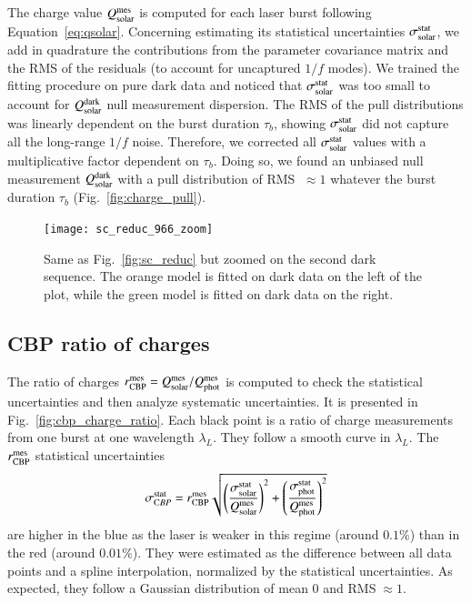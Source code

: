 The charge value $Q_{\mathrm{solar}}^{\mathrm{mes}}$ is computed for each laser burst following Equation~\ref{eq:qsolar}. Concerning estimating its statistical uncertainties $\sigma_{\mathrm{solar}}^{\mathrm{stat}}$, we add in quadrature the contributions from the parameter covariance matrix and the RMS of the residuals (to account for uncaptured $1/f$ modes). We trained the fitting procedure on pure dark data and noticed that $\sigma_{\mathrm{solar}}^{\mathrm{stat}}$ was too small to account for $Q_{\mathrm{solar}}^{\rm dark}$ null measurement dispersion. The RMS of the pull distributions was linearly dependent on the burst duration $\tau_b$, showing $\sigma_{\mathrm{solar}}^{\mathrm{stat}}$ did not capture all the long-range $1/f$ noise. Therefore, we corrected all $\sigma_{\mathrm{solar}}^{\mathrm{stat}}$ values with a multiplicative factor dependent on $\tau_b$. Doing so, we found an unbiased null measurement $Q_{\mathrm{solar}}^{\rm dark}$ with a pull distribution of RMS $\;\approx 1$ whatever the burst duration $\tau_b$ (Fig.~\ref{fig:charge_pull}). 

\begin{figure}%
\centering
\texttt{[image: sc\_reduc\_966\_zoom]}
\caption{Same as Fig.~\ref{fig:sc_reduc} but zoomed on the second dark sequence. The orange model is fitted on dark data on the left of the plot, while the green model is fitted on dark data on the right.}\label{fig:sc_reduc_zoom}
\end{figure}


\subsection{CBP ratio of charges}

The ratio of charges $r_{\rm CBP}^{\rm mes} = Q_{\mathrm{solar}}^{\mathrm{mes}}/Q_{\mathrm{phot}}^{\mathrm{mes}}$ is computed to check the statistical uncertainties and then analyze systematic uncertainties. It is presented in Fig.~\ref{fig:cbp_charge_ratio}. Each black point is a ratio of charge measurements from one burst at one wavelength $\lambda_L$. They follow a smooth curve in $\lambda_L$. The $r_{\rm CBP}^{\rm mes}$ statistical uncertainties 
\begin{equation}
    \sigma_{\mathrm CBP}^{\rm stat} = r_{\rm CBP}^{\rm mes} \sqrt{\left(\frac{\sigma_{\mathrm{solar}}^{\mathrm{stat}}}{Q_{\mathrm{solar}}^{\mathrm{mes}}}\right)^2 +  \left(\frac{\sigma_{\mathrm{phot}}^{\mathrm{stat}}}{Q_{\mathrm{phot}}^{\mathrm{mes}}}\right)^2 }
\end{equation}
are higher in the blue as the laser is weaker in this regime (around $0.1\%$) than in the red (around $0.01\%$). They were estimated as the difference between all data points and a spline interpolation, normalized by the statistical uncertainties. As expected, they follow a Gaussian distribution of mean 0 and RMS$\;\approx 1$. 

